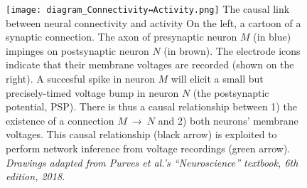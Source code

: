 
\begin{figure}
    \vspace*{-2em}
    \hspace{0.5em}%
    \texttt{[image: diagram\_Connectivity↔Activity.png]}
    \captionn
        {The causal link between neural connectivity and activity}
        {On the left, a cartoon of a synaptic connection. The axon of presynaptic neuron $M$ (in blue) impinges on postsynaptic neuron $N$ (in brown). The electrode icons indicate that their membrane voltages are recorded (shown on the right).
        A succesful spike in neuron $M$ will elicit a small but precisely-timed voltage bump in neuron $N$ (the postsynaptic potential, PSP).
        There is thus a causal relationship between 1) the existence of a connection $M$~→~$N$ and 2) both neurons' membrane voltages. This causal relationship (black arrow) is exploited to perform network inference from voltage recordings (green arrow).\newline
        \small{\emph{Drawings adapted from Purves et al.'s ``Neuroscience'' textbook, 6th edition, 2018.}}}
    \label{fig:diagram_Connectivity-Activity}
\end{figure}
